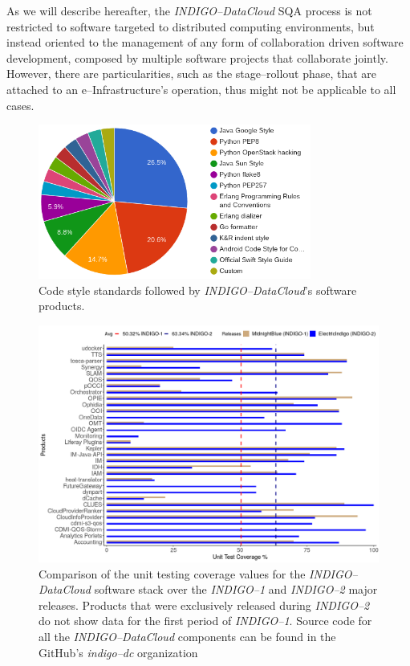 As we will describe hereafter, the {\sl INDIGO--DataCloud} SQA process is not restricted to software targeted to distributed
computing environments, but instead oriented to the management of any form of collaboration driven software development, composed
by multiple software projects that collaborate jointly. However, there are particularities, such
as the stage--rollout phase, that are attached to an e--Infrastructure's operation, thus might not
be applicable to all cases. 

\begin{figure}[ht]
\centering
\includegraphics[width=0.8\textwidth]{images/codestyle.png}
\caption{Code style standards followed by {\sl INDIGO--DataCloud}'s software products.}
\label{fig:fig_codestyle}
\end{figure}

\begin{figure}[ht]
\centering
\includegraphics[width=\textwidth]{images/fig2.png}
\caption{Comparison of the unit testing coverage values for the {\sl INDIGO--DataCloud}
software stack over the {\sl INDIGO--1} and {\sl INDIGO--2} major releases. Products that
were exclusively released during {\sl INDIGO--2} do not show data for the first period of
{\sl INDIGO--1}. Source code for all the {\sl INDIGO--DataCloud} components can be found
in the GitHub's \emph{indigo--dc} organization \cite{foot9}}
\label{fig:fig_unittest}
\end{figure}

